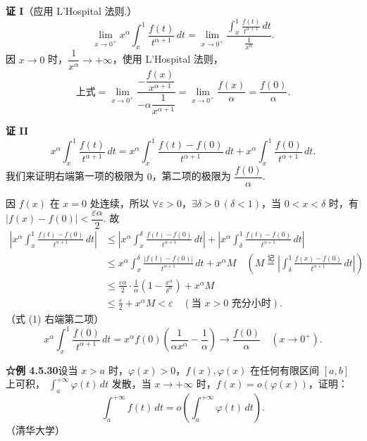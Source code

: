 \documentclass[UTF8, 12pt, fontset=fandol, oneside]{ctexart}
\begin{document}
\noindent\textbf{证 I}\quad （应用 L'Hospital 法则.）
\[
\lim_{x\to0^+}x^\alpha\int_x^1\frac{f(t)}{t^{\alpha+1}}\,dt
=\lim_{x\to0^+}
\frac{\displaystyle\int_x^1\frac{f(t)}{t^{\alpha+1}}\,dt}
{\displaystyle\frac1{x^\alpha}}.
\]
因 $x\to0$ 时，$\dfrac1{x^\alpha}\to+\infty$，使用 L'Hospital 法则，
\[
\text{上式}=\lim_{x\to0^+}
\frac{-\dfrac{f(x)}{x^{\alpha+1}}}
{-\alpha\dfrac1{x^{\alpha+1}}}
=\lim_{x\to0^+}\frac{f(x)}\alpha=\frac{f(0)}\alpha.
\]

\noindent\textbf{证 II}\quad
\[
x^\alpha\int_x^1\frac{f(t)}{t^{\alpha+1}}\,dt
=x^\alpha\int_x^1\frac{f(t)-f(0)}{t^{\alpha+1}}\,dt
+x^\alpha\int_x^1\frac{f(0)}{t^{\alpha+1}}\,dt. \tag{1}
\]
我们来证明右端第一项的极限为 $0$，第二项的极限为 $\dfrac{f(0)}\alpha$.

因 $f(x)$ 在 $x=0$ 处连续，所以 $\forall\varepsilon>0$，$\exists\delta>0\ (\delta<1)$，当 $0<x<\delta$ 时，有
$|f(x)-f(0)|<\dfrac{\varepsilon\alpha}2$. 故
\[
\begin{aligned}
\left|x^\alpha\int_x^1\frac{f(t)-f(0)}{t^{\alpha+1}}\,dt\right|
&\le\left|x^\alpha\int_x^\delta\frac{f(t)-f(0)}{t^{\alpha+1}}\,dt\right|
+\left|x^\alpha\int_\delta^1\frac{f(t)-f(0)}{t^{\alpha+1}}\,dt\right|\\
&\le x^\alpha\int_x^\delta\frac{|f(t)-f(0)|}{t^{\alpha+1}}\,dt+x^\alpha M
\quad\left(M\stackrel{\text{记}}{=}\left|\int_\delta^1\frac{f(x)-f(0)}{t^{\alpha+1}}\,dt\right|\right)\\
&\le\frac{\varepsilon\alpha}2\cdot\frac1\alpha\left(1-\frac{x^\alpha}{\delta^\alpha}\right)+x^\alpha M\\
&\le\frac\varepsilon2+x^\alpha M<\varepsilon\quad(\text{当 }x>0\text{ 充分小时}).
\end{aligned}
\]
（式 (1) 右端第二项）
\[
x^\alpha\int_x^1\frac{f(0)}{t^{\alpha+1}}\,dt
=x^\alpha f(0)\left(\frac1{\alpha x^\alpha}-\frac1\alpha\right)
\longrightarrow\frac{f(0)}\alpha\quad(x\to0^+).
\]

\noindent\textbf{☆例 4.5.30}\quad 设当 $x>a$ 时，$\varphi(x)>0$，$f(x),\varphi(x)$ 在任何有限区间 $[a,b]$ 上可积，
$\displaystyle\int_a^{+\infty}\varphi(t)\,dt$ 发散，当 $x\to+\infty$ 时，$f(x)=o(\varphi(x))$，证明：
\begin{equation}
\int_a^{+\infty}f(t)\,dt=o\left(\int_a^{+\infty}\varphi(t)\,dt\right).
\tag{1}
\end{equation}
（清华大学）
\end{document}
